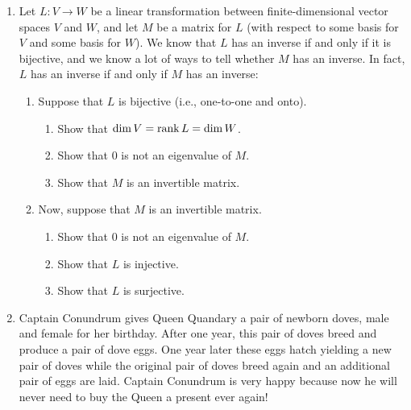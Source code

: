 \begin{enumerate}
\begin{enumerate}
\end{enumerate}

\item Let \(L \colon V \to W\) be a linear transformation between finite-dimensional vector spaces \(V\) and \(W\), and let \(M\) be a matrix for \(L\) (with respect to some basis for \(V\) and some basis for \(W\)). We know that \(L\) has an inverse if and only if it is bijective, and we know a lot of ways to tell whether \(M\) has an inverse. In fact, \(L\) has an inverse if and only if \(M\) has an inverse:
\begin{enumerate}
\item Suppose that \(L\) is bijective (i.e., one-to-one and onto).
\begin{enumerate}
\item Show that \(\operatorname{dim} V=\operatorname{rank} L=\operatorname{dim} W\).
\item Show that \(0\) is not an eigenvalue of \(M\).
\item Show that \(M\) is an invertible matrix. 
\end{enumerate}
\item Now, suppose that \(M\) is an invertible matrix.
\begin{enumerate}
\item Show that \(0\) is not an eigenvalue of \(M\).
\item Show that \(L\) is injective.
\item Show that \(L\) is surjective.
\end{enumerate}
\end{enumerate}

\item Captain Conundrum gives Queen Quandary a pair of newborn doves, male and female for her birthday. After one year, this pair of doves breed and produce a pair of dove eggs. One year later these eggs hatch yielding a new pair of doves while the original pair of doves breed again and an additional pair of eggs are laid.  Captain Conundrum is
very happy because now he will never need to buy the Queen a present ever again! 


\end{enumerate}
